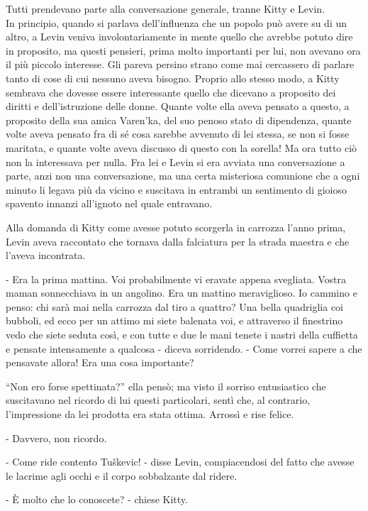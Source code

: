 Tutti prendevano parte alla conversazione generale, tranne Kitty e Levin. \\
In principio, quando si parlava dell'influenza che un popolo può avere su di un altro, a Levin veniva involontariamente in mente quello che avrebbe potuto dire in proposito, ma questi pensieri, prima molto importanti per lui, non avevano ora il più piccolo interesse. Gli pareva persino strano come mai cercassero di parlare tanto di cose di cui nessuno aveva bisogno. Proprio allo stesso modo, a Kitty sembrava che dovesse essere interessante quello che dicevano a proposito dei diritti e dell'istruzione delle donne. Quante volte ella aveva pensato a questo, a proposito della sua amica Varen'ka, del suo penoso stato di dipendenza, quante volte aveva pensato fra di sé cosa sarebbe avvenuto di lei stessa, se non si fosse maritata, e quante volte aveva discusso di questo con la sorella! Ma ora tutto ciò non la interessava per nulla. Fra lei e Levin si era avviata una conversazione a parte, anzi non una conversazione, ma una certa misteriosa comunione che a ogni minuto li legava più da vicino e suscitava in entrambi un sentimento di gioioso spavento innanzi all'ignoto nel quale entravano. 

Alla domanda di Kitty come avesse potuto scorgerla in carrozza l'anno prima, Levin aveva raccontato che tornava dalla falciatura per la strada maestra e che l'aveva incontrata. 

- Era la prima mattina. Voi probabilmente vi eravate appena svegliata. Vostra maman sonnecchiava in un angolino. Era un mattino meraviglioso. Io cammino e penso: chi sarà mai nella carrozza dal tiro a quattro? Una bella quadriglia coi bubboli, ed ecco per un attimo mi siete balenata voi, e attraverso il finestrino vedo che siete seduta così, e con tutte e due le mani tenete i nastri della cuffietta e pensate intensamente a qualcosa - diceva sorridendo. - Come vorrei sapere a che pensavate allora! Era una cosa importante? 

``Non ero forse spettinata?'' ella pensò; ma visto il sorriso entusiastico che suscitavano nel ricordo di lui questi particolari, sentì che, al contrario, l'impressione da lei prodotta era stata ottima. Arrossì e rise felice. 

- Davvero, non ricordo. 

- Come ride contento Tuškevic! - disse Levin, compiacendosi del fatto che avesse le lacrime agli occhi e il corpo sobbalzante dal ridere. 

- È molto che lo conoscete? - chiese Kitty. 

